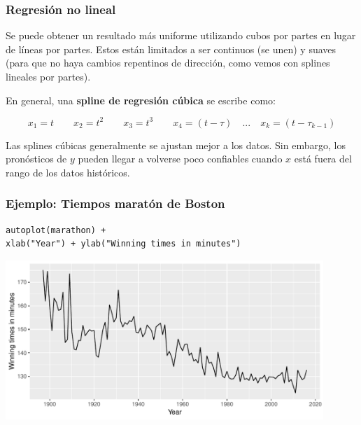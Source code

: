 \documentclass[10pt]{beamer}
\begin{document}





\begin{frame}[fragile]
\frametitle{Regresión no lineal}


Se puede obtener un resultado más uniforme utilizando cubos por partes en lugar de líneas por partes. Estos están limitados a ser continuos (se unen) y suaves (para que no haya cambios repentinos de dirección, como vemos con splines lineales por partes). 

\vspace{3mm}
En general, una \textbf{spline de regresión cúbica} se escribe como:


\begin{equation}
x_1 = t \quad \quad x_2 = t^2 \quad \quad x_3 = t^3 \quad \quad x_4 = (t-\tau) \quad ... \quad x_k =(t-\tau_{k-1})
\end{equation}

\begin{block}{}
\small
Las splines cúbicas generalmente se ajustan mejor a los datos. Sin embargo, los pronósticos de $y$ pueden llegar a volverse poco confiables cuando $x$ está fuera del rango de los datos históricos.
\end{block}


\end{frame}



\begin{frame}[fragile]
\frametitle{Ejemplo: Tiempos maratón de Boston}

\lstset{language=r,label= ,caption= ,captionpos=b,numbers=none}
\begin{lstlisting}
autoplot(marathon) +
xlab("Year") + ylab("Winning times in minutes")
\end{lstlisting}

\pause

\begin{center}
\includegraphics[width=0.9\textwidth]{5-regression_files/figure-beamer/unnamed-chunk-10-1.pdf}
\end{center} 



\end{frame}
\end{document}
